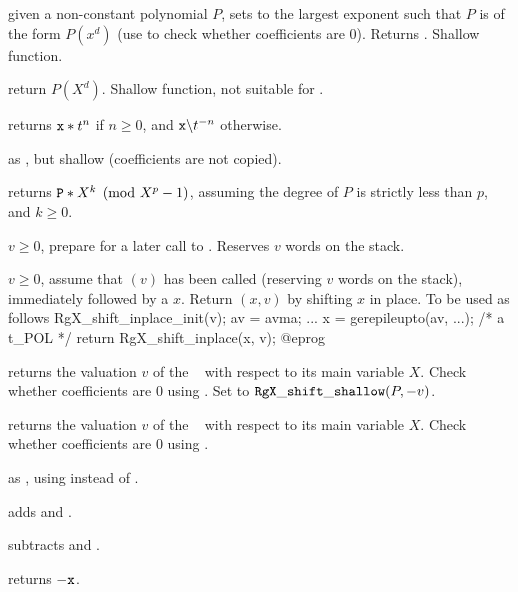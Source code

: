  given a non-constant polynomial
$P$, sets  to the largest exponent such that $P$ is of the form
$P(x^d)$ (use  to check whether coefficients are 0). Returns
. Shallow function.

 return $P(X^d)$. Shallow function, not
suitable for .


 returns ${\tt x} * t^n$ if $n\geq 0$,
and $\kbd{x} \bs t^{-n}$ otherwise.

 as , but
shallow (coefficients are not copied).

 returns ${\tt P} * X^k
\pmod {X^p-1}$, assuming the degree of $P$ is strictly less than $p$, and
$k\geq 0$.

 $v \geq 0$, prepare for a later
call to . Reserves $v$ words on the stack.

 $v \geq 0$, assume that
$(v)$ has been called (reserving $v$ words on the
stack), immediately followed by a  $x$. Return $(x,v)$
by shifting $x$ in place. To be used as follows
\bprog
  RgX_shift_inplace_init(v);
  av = avma;
  ...
  x = gerepileupto(av, ...); /* a t_POL */
  return RgX_shift_inplace(x, v);
@eprog

 returns the valuation $v$ of the
~ with respect to its main variable $X$. Check whether
coefficients are $0$ using . Set  to
${\tt RgX\_shift\_shallow}(P,-v)$.

 returns the valuation $v$ of the
~ with respect to its main variable $X$. Check whether
coefficients are $0$ using .

 as , using
 instead of .


 adds  and .

 subtracts  and .

 returns $-{\tt x}$.

